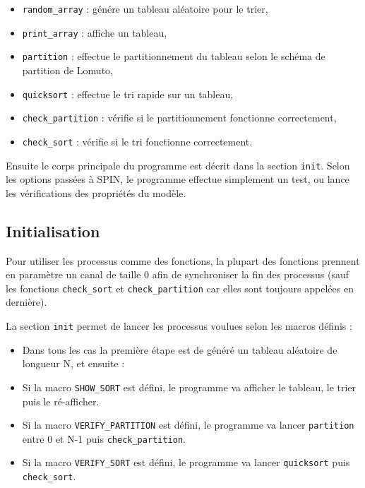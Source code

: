 \documentclass[french]{article}
\begin{document}
\begin{itemize}
    \item \verb:random_array: : génére un tableau aléatoire pour le trier,
    \item \verb:print_array: :  affiche un tableau,
    \item \verb:partition: : effectue le partitionnement du tableau selon le schéma de partition
        de Lomuto,
    \item \verb:quicksort: : effectue le tri rapide sur un tableau,
    \item \verb:check_partition: : vérifie si le partitionnement fonctionne correctement,
    \item \verb:check_sort: : vérifie si le tri fonctionne correctement.
\end{itemize}

Ensuite le corps principale du programme est décrit dans la section \verb:init:. Selon les options
passées à SPIN, le programme effectue simplement un test, ou lance les vérifications des propriétés
du modèle.

\subsection{Initialisation}
Pour utiliser les processus comme des fonctions, la plupart des fonctions prennent en paramètre un
canal de taille 0 afin de synchroniser la fin des processus (sauf les fonctions \verb:check_sort:
et \verb:check_partition: car elles sont toujours appelées en dernière).

La section \verb:init: permet de lancer les processus voulues selon les macros définis :
\begin{itemize}
    \item Dans tous les cas la première étape est de généré un tableau aléatoire de longueur N,
        et ensuite :
    \item Si la macro \verb:SHOW_SORT: est défini, le programme va afficher le tableau, le trier
        puis le ré-afficher.
    \item Si la macro \verb:VERIFY_PARTITION: est défini, le programme va lancer \verb:partition:
        entre 0 et N-1 puis \verb:check_partition:.
    \item Si la macro \verb:VERIFY_SORT: est défini, le programme va lancer \verb:quicksort:
        puis \verb:check_sort:.
\end{itemize}
\end{document}
